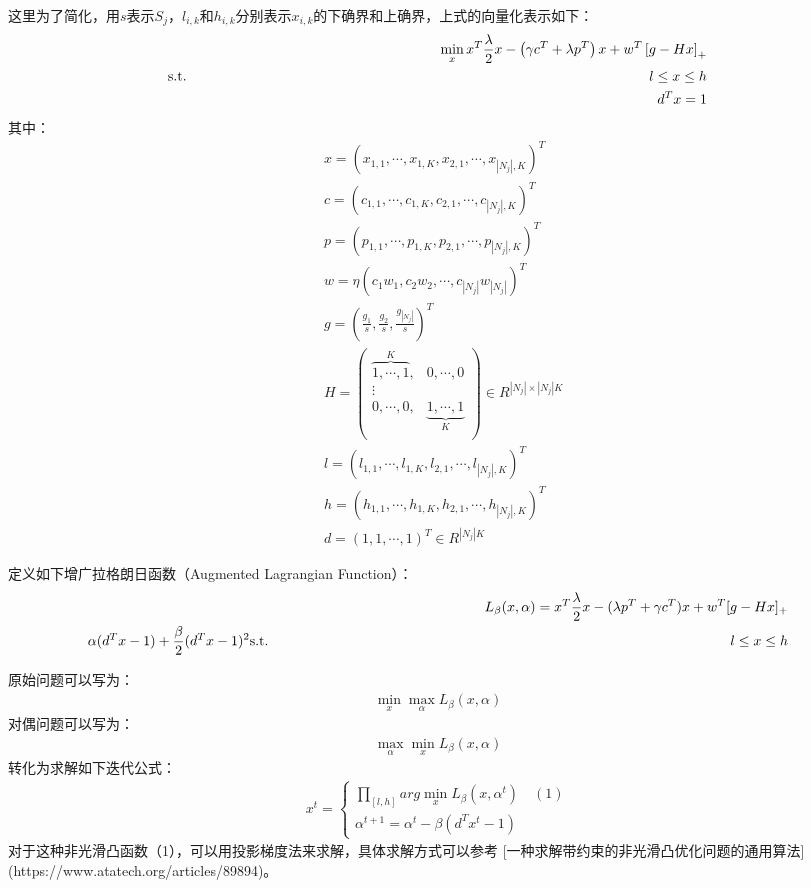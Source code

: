 这里为了简化，用$s$表示$S_j$，$l_{i,k}$和$h_{i,k}$分别表示$x_{i,k}$的下确界和上确界，上式的向量化表示如下：
\begin{align}
\min_x x^T\frac{\lambda}{2}x - \left (\gamma c^T + \lambda p^T \right )x + w^T \left [g-Hx \right ]_+ \\
\leftline{s.t. }
l \leq x \leq h \\
d^Tx=1 
\end{align}
其中：
$$
\begin{aligned}
&x=\left (x_{1,1},\cdots,x_{1,K},x_{2,1},\cdots,x_{|N_j|,K}\right )^T \\
&c=\left (c_{1,1},\cdots,c_{1,K},c_{2,1},\cdots,c_{|N_j|,K}\right )^T \\
&p=\left (p_{1,1},\cdots,p_{1,K},p_{2,1},\cdots,p_{|N_j|,K}\right )^T \\
&w=\eta\left (c_1w_1,c_2w_2,\cdots,c_{|N_j|}w_{|N_j|}\right )^T \\
&g=\left (\frac{g_1}{s},\frac{g_2}{s},\frac{g_{|N_j|}}{s} \right )^T \\
&H=\left(
\begin{matrix}
\overbrace{1,\cdots,1}^{{}K}, &0, \cdots,  0      \\
\vdots       \\
0,\cdots,0, &\underbrace{1,\cdots,1}_{{}K} \\
\end{matrix}
\right) \in R^{|N_j|\times|N_j|K}  \\
&l=\left(l_{1,1},\cdots,l_{1,K},l_{2,1},\cdots,l_{|N_j|,K}\right)^T  \\
&h=\left(h_{1,1},\cdots,h_{1,K},h_{2,1},\cdots,h_{|N_j|,K}\right)^T  \\
&d=\left(1,1,\cdots,1\right)^T\in R^{|N_j|K}
\end{aligned}
$$

定义如下增广拉格朗日函数（Augmented Lagrangian Function）：
\begin{align}
L_{\beta}(x,\alpha)=x^T\frac{\lambda}{2}x - (\lambda p^T + \gamma c^T)x + w^T[g-Hx]_+ \\
\- \alpha(d^Tx-1) + \frac{\beta}{2}(d^Tx-1)^2
\leftline{s.t. }
l \leq x \leq h 
\end{align}

原始问题可以写为：
\begin{align}
\min_x\max_{\alpha}L_{\beta}(x,\alpha)
\end{align}
对偶问题可以写为：
\begin{align}
\max_{\alpha}\min_xL_{\beta}(x,\alpha)
\end{align}
转化为求解如下迭代公式：
\begin{align}
x^t= \begin{cases}  
\prod_{[l,h]}arg\min_xL_{\beta}(x,\alpha^t) \quad (1) \\
\alpha^{t+1}=\alpha^t-\beta(d^Tx^t-1)
\end{cases}
\end{align}
对于这种非光滑凸函数（1），可以用投影梯度法来求解，具体求解方式可以参考
[一种求解带约束的非光滑凸优化问题的通用算法](https://www.atatech.org/articles/89894)。


